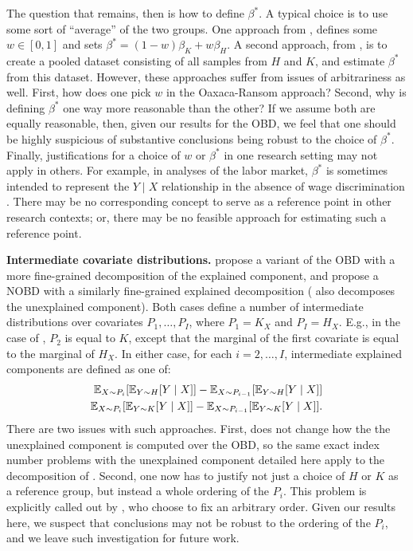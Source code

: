 The question that remains, then is how to define $\beta^*$.
A typical choice is to use some sort of ``average'' of the two groups.
One approach from \citet{oaxacaRansom1998}, defines some $w \in [0,1]$ and sets $\beta^* = (1-w)\beta_K + w\beta_H$.
A second approach, from \citet{neumark1988}, is to create a pooled dataset consisting of all samples from $H$ and $K$, and estimate $\beta^*$ from this dataset.
However, these approaches suffer from issues of arbitrariness as well.
First, how does one pick $w$ in the Oaxaca-Ransom approach?
Second, why is defining $\beta^*$ one way more reasonable than the other?
If we assume both are equally reasonable, then, given our results for the OBD, we feel that one should be highly suspicious of substantive conclusions being robust to the choice of $\beta^*$.
Finally, justifications for a choice of $w$ or $\beta^*$ in one research setting may not apply in others.
For example, in analyses of the labor market, $\beta^*$ is sometimes intended to represent the $Y \mid X$ relationship in the absence of wage discrimination \citep{neumark1988}. 
There may be no corresponding concept to serve as a reference point in other research contexts; or, there may be no feasible approach for estimating such a reference point.

\textbf{Intermediate covariate distributions.}
\citet{dinardoFortinLemieux1996} propose a variant of the OBD with a more fine-grained decomposition of the explained component, and \citet{quintero2025} propose a NOBD with a similarly fine-grained explained decomposition (\citet{quintero2025} also decomposes the unexplained component).
Both cases define a number of intermediate distributions over covariates $P_1, \dots, P_I$, where $P_1 = K_X$ and $P_I = H_X$. E.g., in the case of \citet{quintero2025}, $P_2$ is equal to $K$, except that the marginal of the first covariate is equal to the marginal of $H_X$.
In either case, for each $i = 2, \dots, I$, intermediate explained components are defined as one of:
\begin{align}
  \mathbb{E}_{X \sim P_i}[ \mathbb{E}_{Y \sim H}[Y \mid X] ] - \mathbb{E}_{X \sim P_{i-1}} [ \mathbb{E}_{Y \sim H} [Y \mid X]] \\
  \mathbb{E}_{X \sim P_i}[ \mathbb{E}_{Y \sim K}[Y \mid X] ] - \mathbb{E}_{X \sim P_{i-1}} [ \mathbb{E}_{Y \sim K} [Y \mid X]].
\end{align}  
There are two issues with such approaches.
First, \citet{dinardoFortinLemieux1996} does not change how the the unexplained component is computed over the OBD, so the same exact index number problems with the unexplained component detailed here apply to the decomposition of \citet{dinardoFortinLemieux1996}.
Second, one now has to justify not just a choice of $H$ or $K$ as a reference group, but instead a whole ordering of the $P_i$.
This problem is explicitly called out by \citet{quintero2025}, who choose to fix an arbitrary order.
Given our results here, we suspect that conclusions may not be robust to the ordering of the $P_i$, and we leave such investigation for future work.
